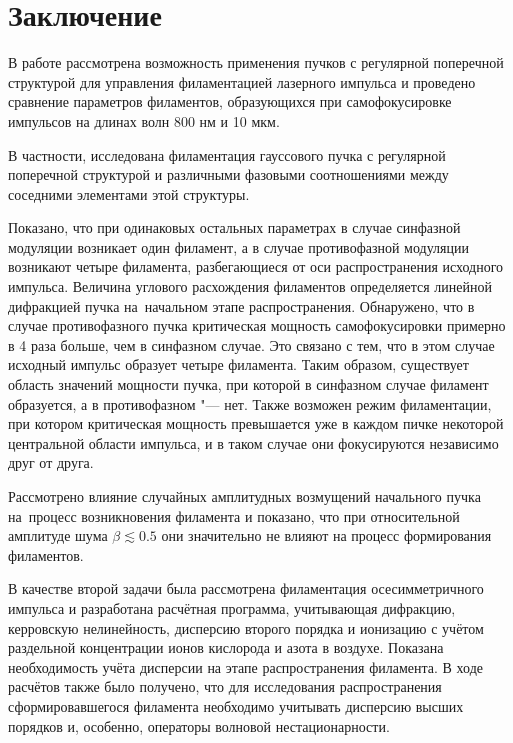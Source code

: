 \cleardoublepage
{}
\section*{Заключение}

В работе рассмотрена возможность применения пучков с регулярной поперечной структурой
для управления филаментацией лазерного импульса и проведено сравнение параметров филаментов,
образующихся при самофокусировке импульсов на длинах волн 800 нм и 10 мкм.


В частности, исследована филаментация гауссового пучка с регулярной поперечной структурой
и различными фазовыми соотношениями между соседними элементами этой структуры.

Показано, что при одинаковых остальных параметрах в случае синфазной модуляции
возникает один филамент, а в случае противофазной модуляции
возникают четыре филамента, разбегающиеся от оси распространения исходного
импульса. Величина углового расхождения филаментов определяется линейной дифракцией
пучка на~начальном этапе распространения. Обнаружено, что в случае противофазного
пучка критическая мощность самофокусировки примерно в 4 раза больше, чем в синфазном случае.
Это связано с тем, что в этом случае исходный импульс образует четыре
филамента. Таким образом, существует область значений мощности пучка, при которой
в синфазном случае филамент образуется, а в противофазном "--- нет.
Также возможен режим филаментации, при котором критическая мощность превышается уже в каждом пичке
некоторой центральной области импульса, и в таком случае они фокусируются независимо друг от друга.


Рассмотрено влияние случайных амплитудных возмущений начального пучка на~процесс
возникновения филамента и показано, что при относительной амплитуде шума
$\beta \lesssim 0.5$ они значительно не влияют на процесс формирования филаментов.


В качестве второй задачи была рассмотрена филаментация осесимметричного импульса и разработана расчётная программа, учитывающая дифракцию,
керровскую нелинейность, дисперсию второго порядка и ионизацию с учётом раздельной концентрации ионов кислорода и азота в воздухе.
Показана необходимость учёта дисперсии на этапе распространения филамента. В ходе расчётов также было получено, что для исследования распространения
сформировавшегося филамента необходимо учитывать дисперсию высших порядков и, особенно, операторы волновой нестационарности.


